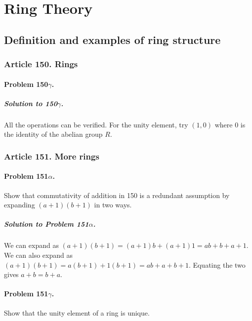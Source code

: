 \newcommand{\ideal}[1]{\mathsf{\mathbf{#1}}}

\chapter{Ring Theory}

\section{Definition and examples of ring structure}


\subsection{Article 150. Rings}
\subsubsection{Problem 150$\gamma$.}

\paragraph*{Solution to 150$\gamma$.}
All the operations can be verified. For the unity element, try $(1, 0)$ where
$0$ is the identity of the abelian group $R$.

\subsection{Article 151. More rings}
\subsubsection{Problem 151$\alpha$.}
Show that commutativity of addition in 150 is a redundant assumption by
expanding $(a+1)(b+1)$ in two ways.

\paragraph*{Solution to Problem 151$\alpha$.}
We can expand as $(a+1)(b+1) = (a+1)b + (a+1)1 = ab + b + a + 1$. We can also
expand as $(a+1)(b+1) = a(b+1) + 1(b+1) = ab + a + b + 1$. Equating the two
gives $ a+b = b+a $.

\subsubsection{Problem 151$\gamma$.}
Show that the unity element of a ring is unique.

